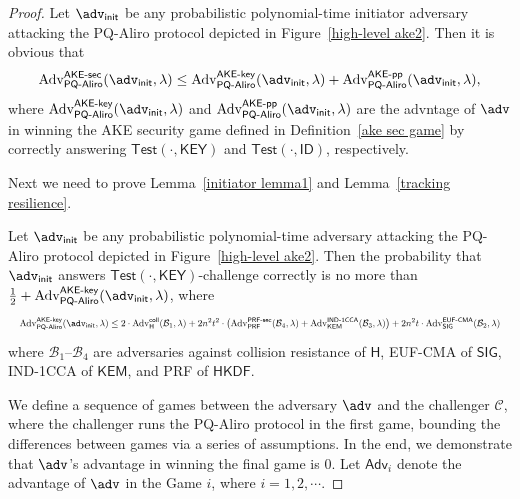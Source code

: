 \documentclass[runningheads]{llncs}
\newcommand{\kem}{\mathsf{KEM}}
\newcommand{\hkdf}{\mathsf{HKDF}}
\begin{document}
\begin{proof}

    Let $\adv_{\sf init}$ be any probabilistic polynomial-time initiator adversary attacking the PQ-Aliro protocol depicted in Figure~\ref{high-level ake2}. Then it is obvious that
    $$    \operatorname{Adv}_{\mathsf{PQ}\text{-}\mathsf{Aliro}}^{\mathsf{AKE}\text{-}\mathsf{sec}}(\adv_{\mathsf{init}}, \lambda)
    \leq \mathrm{Adv}_{\mathsf{PQ}\text{-}\mathsf{Aliro}}^{\mathsf{AKE}\text{-}\mathsf{key}}(\adv_{\sf init},\lambda) + \mathrm{Adv}_{\mathsf{PQ}\text{-}\mathsf{Aliro}}^{\mathsf{AKE}\text{-}\mathsf{pp}}(\adv_{\sf init},\lambda),
    $$
where $\mathrm{Adv}_{\mathsf{PQ}\text{-}\mathsf{Aliro}}^{\mathsf{AKE}\text{-}\mathsf{key}}(\adv_{\sf init},\lambda)$ and $\mathrm{Adv}_{\mathsf{PQ}\text{-}\mathsf{Aliro}}^{\mathsf{AKE}\text{-}\mathsf{pp}}(\adv_{\sf init},\lambda)$ are the advntage of $\adv$ in winning the AKE security game defined in Definition~\ref{ake sec game} by correctly answering $\mathsf{Test}(\cdot, \mathsf{KEY})$ and $\mathsf{Test}(\cdot, \mathsf{ID})$, respectively.


Next we need to prove Lemma~\ref{initiator lemma1} and Lemma~\ref{tracking resilience}.

\begin{lemma}
    \label{initiator lemma1}
    Let $\adv_{\sf init}$ be any probabilistic polynomial-time adversary attacking the PQ-Aliro protocol depicted in Figure~\ref{high-level ake2}. Then  the probability that $\adv_{\sf init}$ answers $\mathsf{Test}(\cdot, \mathsf{KEY})$-challenge correctly is no more than $\frac{1}{2} + \mathrm{Adv}_{\mathsf{PQ}\text{-}\mathsf{Aliro}}^{\mathsf{AKE}\text{-}\mathsf{key}}(\adv_{\sf init},\lambda)$, where
\begin{equation*}
\resizebox{\linewidth}{!}{$\displaystyle
\mathrm{Adv}_{\mathsf{PQ}\text{-}\mathsf{Aliro}}^{\mathsf{AKE}\text{-}\mathsf{key}}(\adv_{\sf init},\lambda)
\leq 2\cdot \operatorname{Adv}_{\mathsf{H}}^{\mathsf{coll}}(\mathcal{B}_{1}, \lambda)
+ 2n^{2} t^{2} \cdot \bigl( \operatorname{Adv}_{\mathsf{PRF}}^{\mathsf{PRF}\text{-}\mathsf{sec}}(\mathcal{B}_{4}, \lambda)
+ \operatorname{Adv}_{\kem}^{\mathsf{IND}\text{-}\mathsf{1CCA}}(\mathcal{B}_{3},\lambda)\bigr)
+ 2n^{2} t \cdot \operatorname{Adv}_{\mathsf{SIG}}^{\mathsf{EUF}\text{-}\mathsf{CMA}}(\mathcal{B}_{2}, \lambda)
$}
\end{equation*}
where $\mathcal{B}_{1}$--$\mathcal{B}_{4}$ are adversaries against collision resistance of $\mathsf{H}$, EUF-CMA of $\mathsf{SIG}$, IND-1CCA of $\kem$, and PRF of $\hkdf$.
    \end{lemma}
    We define a sequence of games between the adversary $\adv$ and the challenger $\mathcal{C}$, where the challenger runs the PQ-Aliro protocol in the first game, bounding the differences between games via a series of assumptions.
    In the end, we demonstrate that $\adv$'s advantage in winning the final game is 0.
    Let $\textsf{Adv}_{i}$ denote the advantage of $\adv$ in the Game $i$, where $i = 1,2, \cdots$.


\end{proof}
\end{document}
